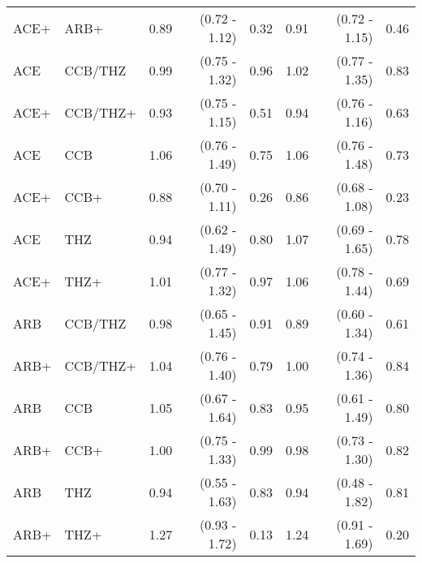 \documentclass[11pt,]{article}
\begin{document}
\begin{table}[H]
{\begin{tabular}{llrrrrrr}
  ACE+ & ARB+ & 0.89 & (0.72 - 1.12) & 0.32 & 0.91 & (0.72 - 1.15) & 0.46 \\ 
  ACE & CCB/THZ & 0.99 & (0.75 - 1.32) & 0.96 & 1.02 & (0.77 - 1.35) & 0.83 \\ 
  ACE+ & CCB/THZ+ & 0.93 & (0.75 - 1.15) & 0.51 & 0.94 & (0.76 - 1.16) & 0.63 \\ 
  ACE & CCB & 1.06 & (0.76 - 1.49) & 0.75 & 1.06 & (0.76 - 1.48) & 0.73 \\ 
  ACE+ & CCB+ & 0.88 & (0.70 - 1.11) & 0.26 & 0.86 & (0.68 - 1.08) & 0.23 \\ 
  ACE & THZ & 0.94 & (0.62 - 1.49) & 0.80 & 1.07 & (0.69 - 1.65) & 0.78 \\ 
  ACE+ & THZ+ & 1.01 & (0.77 - 1.32) & 0.97 & 1.06 & (0.78 - 1.44) & 0.69 \\ 
  ARB & CCB/THZ & 0.98 & (0.65 - 1.45) & 0.91 & 0.89 & (0.60 - 1.34) & 0.61 \\ 
  ARB+ & CCB/THZ+ & 1.04 & (0.76 - 1.40) & 0.79 & 1.00 & (0.74 - 1.36) & 0.84 \\ 
  ARB & CCB & 1.05 & (0.67 - 1.64) & 0.83 & 0.95 & (0.61 - 1.49) & 0.80 \\ 
  ARB+ & CCB+ & 1.00 & (0.75 - 1.33) & 0.99 & 0.98 & (0.73 - 1.30) & 0.82 \\ 
  ARB & THZ & 0.94 & (0.55 - 1.63) & 0.83 & 0.94 & (0.48 - 1.82) & 0.81 \\ 
  ARB+ & THZ+ & 1.27 & (0.93 - 1.72) & 0.13 & 1.24 & (0.91 - 1.69) & 0.20 \\ 
    \bottomrule
  \end{tabular}
  }
\end{table}
\end{document}
